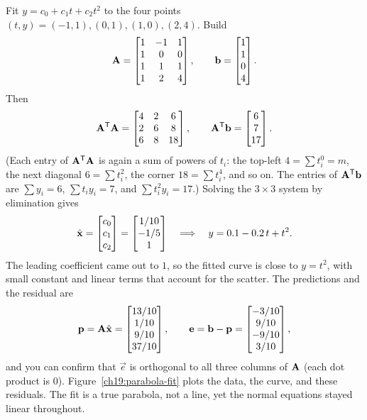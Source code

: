 \begin{example}\label{ch19:parabola}
Fit $y=c_0+c_1t+c_2t^2$ to the four points $(t,y)=(-1,1),(0,1),(1,0),(2,4)$. Build
\[
  \mathbf{A}=\begin{bmatrix} 1&-1&1\\ 1&0&0\\ 1&1&1\\ 1&2&4\end{bmatrix},
  \qquad
  \mathbf{b}=\begin{bmatrix}1\\1\\0\\4\end{bmatrix}.
\]
Then
\[
  \mathbf{A}^{\mathsf{T}}\mathbf{A}
  =\begin{bmatrix} 4 & 2 & 6\\ 2 & 6 & 8\\ 6 & 8 & 18\end{bmatrix},
  \qquad
  \mathbf{A}^{\mathsf{T}}\mathbf{b}=\begin{bmatrix}6\\7\\17\end{bmatrix}.
\]
(Each entry of $\mathbf{A}^{\mathsf{T}}\mathbf{A}$ is again a sum of powers of $t_i$: the top-left $4=\sum t_i^0=m$,
the next diagonal $6=\sum t_i^2$, the corner $18=\sum t_i^4$, and so on. The entries of
$\mathbf{A}^{\mathsf{T}}\mathbf{b}$ are $\sum y_i=6$, $\sum t_i y_i=7$, and $\sum t_i^2 y_i=17$.) Solving the
$3\times3$ system by elimination gives
\[
  \hat{\mathbf{x}}=\begin{bmatrix}c_0\\c_1\\c_2\end{bmatrix}=\begin{bmatrix}1/10\\ -1/5 \\ 1\end{bmatrix}
  \quad\Longrightarrow\quad
  y = 0.1 - 0.2\,t + t^2 .
\]
The leading coefficient came out to $1$, so the fitted curve is close to $y=t^2$, with small
constant and linear terms that account for the scatter. The predictions and the residual are
\[
  \mathbf{p}=\mathbf{A}\hat{\mathbf{x}}
  =\begin{bmatrix}13/10\\ 1/10\\ 9/10\\ 37/10\end{bmatrix},
  \qquad
  \mathbf{e}=\mathbf{b}-\mathbf{p}=\begin{bmatrix}-3/10\\ 9/10\\ -9/10\\ 3/10\end{bmatrix},
\]
and you can confirm that $\vec{e}$ is orthogonal to all three columns of $\mathbf{A}$ (each dot product is $0$).
Figure~\ref{ch19:parabola-fit} plots the data, the curve, and these residuals.
The fit is a true parabola, not a line, yet the normal equations stayed linear throughout.
\end{example}

